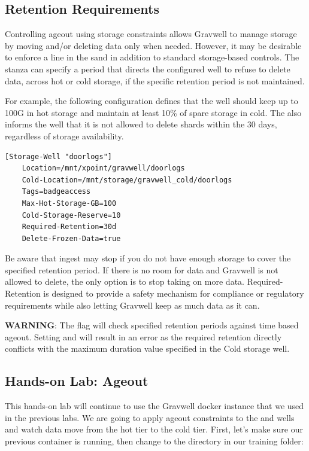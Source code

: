 {{\subsection{Retention Requirements}

Controlling ageout using storage constraints allows Gravwell to manage storage
by moving and/or deleting data only when needed. However, it may be desirable
to enforce a line in the sand in addition to standard storage-based controls.
The  stanza can specify a period that directs the configured
well to refuse to delete data, across hot or cold storage,
if the specific retention period is not maintained.

For example, the following configuration defines that the well should keep up
to 100G in hot storage and maintain at least 10\% of spare storage in cold.
The  also informs the well that it is not allowed
to delete shards within the 30 days, regardless of storage availability.

\begin{Verbatim}[breaklines=true]
[Storage-Well "doorlogs"]
	Location=/mnt/xpoint/gravwell/doorlogs
	Cold-Location=/mnt/storage/gravwell_cold/doorlogs
	Tags=badgeaccess
	Max-Hot-Storage-GB=100
	Cold-Storage-Reserve=10
	Required-Retention=30d
	Delete-Frozen-Data=true	
\end{Verbatim}

Be aware that ingest may stop if you do not have enough storage to cover the
specified retention period. If there is no room for data and Gravwell is not
allowed to delete, the only option is to stop taking on more data.
Required-Retention is designed to provide a safety mechanism for compliance
or regulatory requirements while also letting Gravwell keep as much data as it can.


\textbf{WARNING}: The  flag will check specified retention
periods against time based ageout. Setting  and
 will result in an error as the required retention
directly conflicts with the maximum duration value specified in the Cold storage well.

\clearpage
\subsection{Hands-on Lab: Ageout}

This hands-on lab will continue to use the Gravwell docker instance
that we used in the previous labs. We are going to apply ageout
constraints to the  and  wells and watch data move
from the hot tier to the cold tier. First, let's make sure our previous
container is running, then change to the  directory in
our training folder:

}}
